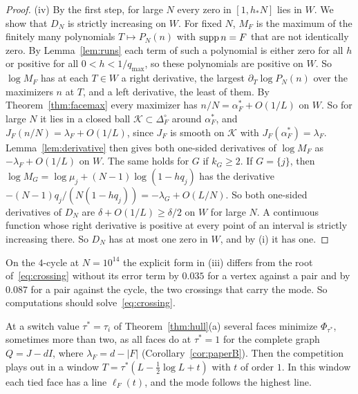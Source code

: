 \begin{proof}
(iv) By the first step, for large $N$ every zero in $[1,h_*N]$ lies in $W$. We show that $D_N$ is strictly increasing
on $W$. For fixed $N$, $M_F$ is the maximum of the finitely many polynomials $T\mapsto P_N(n)$
with $\operatorname{supp} n=F$ that are not identically zero. By Lemma~\ref{lem:runs} each term of such a
polynomial is either zero for all $h$ or positive for all $0<h<1/q_{\max}$, so these polynomials
are positive on $W$. So $\log M_F$ has at each $T\in W$ a right
derivative, the largest $\partial_T\log P_N(n)$ over the maximizers $n$ at $T$, and a left
derivative, the least of them. By Theorem~\ref{thm:facemax} every maximizer has
$n/N=\alpha^*_F+O(1/L)$ on $W$. So for large $N$ it lies in a closed ball
$\mathcal K\subset\Delta_F^\circ$ around $\alpha^*_F$, and $J_F(n/N)=\lambda_F+O(1/L)$, since
$J_F$ is smooth on $\mathcal K$ with $J_F(\alpha^*_F)=\lambda_F$. Lemma~\ref{lem:derivative}
then gives both one-sided derivatives of $\log M_F$ as $-\lambda_F+O(1/L)$ on $W$. The same
holds for $G$ if $k_G\ge2$. If $G=\{j\}$, then $\log M_G=\log\mu_j+(N-1)\log(1-hq_j)$ has the
derivative $-(N-1)q_j/(N(1-hq_j))=-\lambda_G+O(L/N)$. So both one-sided derivatives of $D_N$
are $\delta+O(1/L)\ge\delta/2$ on $W$ for large $N$. A continuous function whose right
derivative is positive at every point of an interval is strictly increasing there. So $D_N$
has at most one zero in $W$, and by (i) it has one.
\end{proof}

On the $4$-cycle at $N=10^{14}$ the explicit form in (iii) differs from the root
of~\eqref{eq:crossing} without its error term by $0.035$ for a vertex against a pair and by
$0.087$ for a pair against the cycle, the two crossings that carry the mode. So computations
should solve~\eqref{eq:crossing}.

At a switch value $\tau^*=\tau_i$ of Theorem~\ref{thm:hull}(a) several faces minimize
$\Phi_{\tau^*}$, sometimes more than two, as all faces do at $\tau^*=1$ for the
complete graph $Q=J-dI$, where $\lambda_F=d-|F|$\ifarxivbuild{} (Corollary~\ref{cor:paperB})\fi. Then the competition plays out in a window $T=\tau^*(L-\frac12\log L+t)$ with $t$ of
order $1$. In this window each tied face has a line $\ell_F(t)$, and the mode
follows the highest line.

